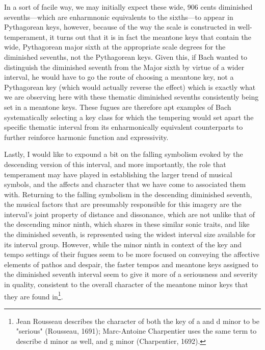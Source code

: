     \begin{center}
    \end{center}
    

    \begin{center}
    \end{center}
    
    In a sort of facile way, we may initially expect these wide, 906 cents
diminished sevenths---which are enharmnonic equivalents to the
sixths---to appear in Pythagorean keys, however, because of the way
the scale is constructed in well-temperament, it turns out that it is in
fact the meantone keys that contain the wide, Pythagorean major sixth at
the appropriate scale degrees for the diminished sevenths, not the
Pythagorean keys. Given this, if Bach wanted to distinguish the
diminished seventh from the Major sixth by virtue of a wider interval,
he would have to go the route of choosing a meantone key, not a
Pythagorean key (which would actually reverse the effect) which is
exactly what we are observing here with these thematic diminished
sevenths consistently being set in a meantone keys. These fugues are
therefore apt examples of Bach systematically selecting a key class for
which the tempering would set apart the specific thematic interval from
its enharmonically equivalent counterparts to further reinforce harmonic
function and expressivity.

Lastly, I would like to expound a bit on the falling symbolism evoked by
the descending version of this interval, and more importantly, the role
that temperament may have played in establishing the larger trend of
musical symbols, and the affects and character that we have come to
associated them with. Returning to the falling symbolism in the
descending diminished seventh, the musical factors that are presumably
responsible for this imagery are the interval's joint property of
distance and dissonance, which are not unlike that of the descending
minor ninth, which shares in these similar sonic traits, and like the
diminished seventh, is represented using the widest interval size
available for its interval group. However, while the minor ninth in
context of the key and tempo settings of their fugues seem to be more
focused on conveying the affective elements of pathos and despair, the
faster tempos and meantone keys assigned to the diminished seventh
interval seem to give it more of a seriousness and severity in quality,
consistent to the overall character of the meantone minor keys that they
are found
in\footnote{Jean Rousseau describes the character of both the key of a and d minor to be "serious" (Rousseau, 1691); Marc-Antoine Charpentier uses the same term to describe d minor as well, and g minor (Charpentier, 1692).}.

